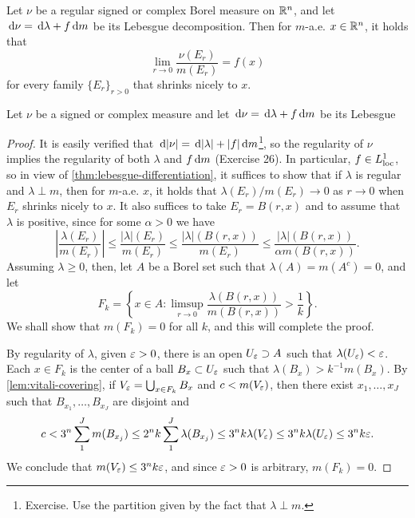 \documentclass[12pt]{article} %
\begin{document}
\begin{theorem}\label{thm:3.22}
    Let $\nu$ be a regular signed or complex Borel measure on $\mathbb{R}^n$, and let $\, \mathrm{d} \nu = \, \mathrm{d} \lambda + f \, \mathrm{d} m$ be its Lebesgue decomposition. Then for $m$-a.e. $x \in \mathbb{R}^n$, it holds that \[\lim_{r \to 0} \frac{\nu(E_r)}{m(E_r)} = f(x)\] for every family $\{E_r\}_{r > 0}$ that shrinks nicely to $x$.
\end{theorem}

\begin{exercise}
    Let $\nu$ be a signed or complex measure and let $\, \mathrm{d} \nu = \, \mathrm{d} \lambda + f \, \mathrm{d} m$ be its Lebesgue
\end{exercise}

\begin{proof}
    It is easily verified that $\, \mathrm{d} |\nu| = \, \mathrm{d} |\lambda| + |f|\, \mathrm{d} m$\footnote{Exercise. Use the partition given by the fact that $\lambda \perp m$.}, so the regularity of $\nu$ implies the regularity of both $\lambda$ and $f \, \mathrm{d} m$ (Exercise 26). In particular, $f \in L_{\operatorname{loc}}^1$, so in view of \cref{thm:lebesgue-differentiation}, it suffices to show that if $\lambda$ is regular and $\lambda \perp m$, then for $m$-a.e. $x$, it holds that $\lambda(E_r) / m(E_r) \to 0$ as $r \to 0$ when $E_r$ shrinks nicely to $x$. It also suffices to take $E_r = B(r, x)$ and to assume that $\lambda$ is positive, since for some $\alpha > 0$ we have \[\left|\frac{\lambda(E_r)}{m(E_r)}\right| \leq \frac{|\lambda|(E_r)}{m(E_r)} \leq \frac{|\lambda|(B(r, x))}{m(E_r)} \leq \frac{|\lambda|(B(r, x))}{\alpha m(B(r, x))}.\] Assuming $\lambda \geq 0$, then, let $A$ be a Borel set such that $\lambda(A) = m(A^c) = 0$, and let \[F_k = \left\{ x \in A : \limsup_{r \to 0} \frac{\lambda(B(r, x))}{m(B(r, x))} > \frac{1}{k} \right\}.\] We shall show that $m(F_k) = 0$ for all $k$, and this will complete the proof.

    By regularity of $\lambda$, given $\varepsilon > 0$, there is an open $U_\varepsilon \supset A$ such that $\lambda(U_\varepsilon) < \varepsilon$. Each $x \in F_k$ is the center of a ball $B_x \subset U_\varepsilon$ such that $\lambda(B_x) > k^{-1}m(B_x)$. By \cref{lem:vitali-covering}, if $V_\varepsilon = \bigcup_{x \in F_k} B_x$ and $c < m(V_\varepsilon)$, then there exist $x_1, \ldots, x_J$ such that $B_{x_1}, \ldots, B_{x_J}$ are disjoint and \[c < 3^n \sum_1^J m(B_{x_j}) \leq 2^n k \sum_1^J \lambda(B_{x_j}) \leq 3^n k \lambda(V_\varepsilon) \leq 3^n k \lambda(U_\varepsilon) \leq 3^n k \varepsilon.\] We conclude that $m(V_\varepsilon) \leq 3^n k \varepsilon$, and since $\varepsilon > 0$ is arbitrary, $m(F_k) = 0$.
\end{proof}
\end{document}
